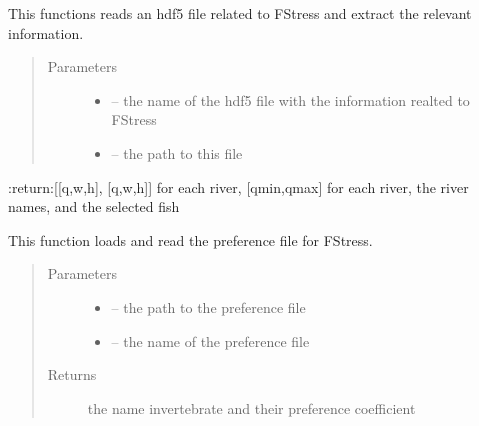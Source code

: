 \documentclass[letterpaper,10pt,english]{sphinxmanual}
\begin{document}
\begin{fulllineitems}
\label{\detokenize{index:src.fstress.read_fstress_hdf5}}
This functions reads an hdf5 file related to FStress and extract the relevant information.
\begin{quote}\begin{description}
\item[{Parameters}] \leavevmode\begin{itemize}
\item {} 
 -- the name of the hdf5 file with the information realted to FStress

\item {} 
 -- the path to this file

\end{itemize}

\end{description}\end{quote}

:return:{[}{[}q,w,h{]}, {[}q,w,h{]}{]} for each river, {[}qmin,qmax{]} for each river, the river names, and the selected fish

\end{fulllineitems}


\begin{fulllineitems}
\label{\detokenize{index:src.fstress.read_pref}}
This function loads and read the preference file for FStress.
\begin{quote}\begin{description}
\item[{Parameters}] \leavevmode\begin{itemize}
\item {} 
 -- the path to the preference file

\item {} 
 -- the name of the preference file

\end{itemize}

\item[{Returns}] \leavevmode
the name invertebrate and their preference coefficient

\end{description}\end{quote}

\end{fulllineitems}
\end{document}
